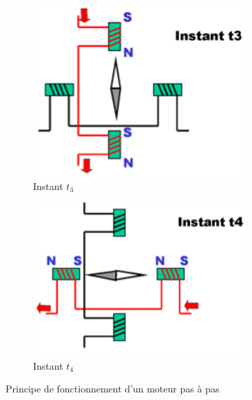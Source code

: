 \documentclass[10pt,fleqn]{article} %
\begin{document}
\begin{figure}[h]
  \begin{subfigure}{0.245\textwidth}
    \centering
    \includegraphics[width=0.9\textwidth]{images/moteur_paspas3}
    \caption{Instant $t_3$}
  \end{subfigure}
  \begin{subfigure}{.245\textwidth}
    \centering
    \includegraphics[width=0.9\textwidth]{images/moteur_paspas4}
    \caption{Instant $t_4$}
  \end{subfigure}
  \caption{Principe de fonctionnement d'un moteur pas à pas}
  \label{fig:paspas}
\end{figure}
\end{document}
